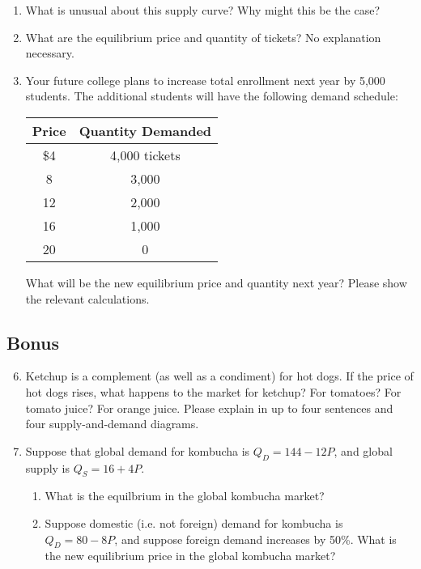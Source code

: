 \documentclass{article}
\begin{document}
\begin{enumerate}
	\begin{enumerate}
	
	\item What is unusual about this supply curve? Why might this be the case?
	
	\item What are the equilibrium price and quantity of tickets? No explanation necessary. 
	
	\item Your future college plans to increase total enrollment next year by 5,000 students. The additional students will have the following demand schedule:
	
	\begin{center}
	\begin{tabular}{c c}
	\textbf{Price} & \textbf{Quantity Demanded} \\
	\hline
	\$4 & 4,000 tickets \\
	8 & 3,000 \\
	12 & 2,000 \\
	16 & 1,000 \\
	20 & 0 \\
	\end{tabular}
	\end{center}
	
	What will be the new equilibrium price and quantity next year? Please show the relevant calculations. 
	
	\end{enumerate}
	
\end{enumerate}

\subsection*{Bonus}

\begin{enumerate}
\setcounter{enumi}{5}
	
\item Ketchup is a complement (as well as a condiment) for hot dogs. If the price of hot dogs rises, what happens to the market for ketchup? For tomatoes? For tomato juice? For orange juice. Please explain in up to four sentences and four supply-and-demand diagrams.

\item Suppose that global demand for kombucha is $Q_D = 144 - 12P$, and global supply is $Q_S = 16 + 4P$.

	\begin{enumerate}
	
	\item What is the equilbrium in the global kombucha market?
	
	\item Suppose domestic (i.e. not foreign) demand for kombucha is $Q_D = 80 - 8P$, and suppose foreign demand increases by 50\%. What is the new equilibrium price in the global kombucha market?
	
	\end{enumerate}

\end{enumerate}
\end{document}

